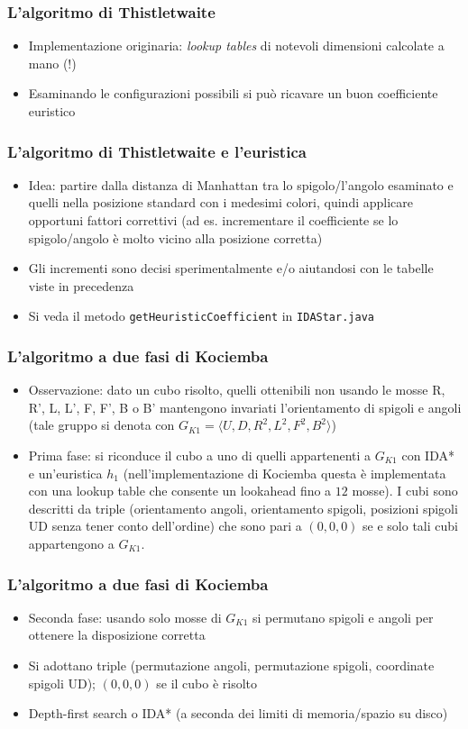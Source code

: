 \documentclass{beamer}
\begin{document}
\begin{frame}
\frametitle{L'algoritmo di Thistletwaite}
\begin{itemize}
\item Implementazione originaria: \emph{lookup tables} di notevoli dimensioni
calcolate a mano (!)
\item Esaminando le configurazioni possibili si può ricavare un buon
coefficiente euristico
\end{itemize}
\end{frame}

\begin{frame}
\frametitle{L'algoritmo di Thistletwaite e l'euristica}
\begin{itemize}
\item Idea: partire dalla distanza di Manhattan tra lo spigolo/l'angolo
esaminato e quelli nella posizione standard con i medesimi colori, quindi
applicare opportuni fattori correttivi (ad es. incrementare il coefficiente se
lo spigolo/angolo è molto vicino alla posizione corretta)
\item Gli incrementi sono decisi sperimentalmente e/o aiutandosi con le tabelle
viste in precedenza
\item Si veda il metodo \texttt{getHeuristicCoefficient} in
\texttt{IDAStar.java}
\end{itemize}
\end{frame}

\begin{frame}
\frametitle{L'algoritmo a due fasi di Kociemba}
\begin{itemize}
\item Osservazione: dato un cubo risolto, quelli ottenibili non usando le mosse
R, R', L, L', F, F', B o B' mantengono invariati l'orientamento di spigoli e
angoli (tale gruppo si denota con $G_{K1} = \langle U, D, R^2, L^2, F^2,
B^2\rangle$)
\item Prima fase: si riconduce il cubo a uno di quelli appartenenti a $G_{K1}$
con IDA* e un'euristica $h_1$ (nell'implementazione di Kociemba questa è
implementata con una lookup table che consente un lookahead fino a $12$ mosse).
I cubi sono descritti da triple (orientamento angoli, orientamento spigoli,
posizioni spigoli UD senza tener conto dell'ordine) che sono pari a $(0, 0, 0)$
se e solo tali cubi appartengono a $G_{K1}$.
\end{itemize}
\end{frame}

\begin{frame}
\frametitle{L'algoritmo a due fasi di Kociemba}
\begin{itemize}
\item Seconda fase: usando solo mosse di $G_{K1}$ si permutano spigoli e angoli
per ottenere la disposizione corretta
\item Si adottano triple (permutazione angoli, permutazione spigoli, coordinate
spigoli UD); $(0, 0, 0)$ se il cubo è risolto
\item Depth-first search o IDA* (a seconda dei limiti di memoria/spazio su
disco)
\end{itemize}
\end{frame}
\end{document}
